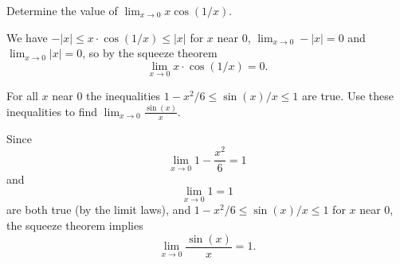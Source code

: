 \documentclass[nooutcomes]{ximera}
\begin{document}
\begin{problem}


  Determine the value of $\displaystyle\lim_{x \to 0} x \cos(1/x)$.
  \begin{freeResponse}
    We have $-|x| \le x \cdot \cos(1/x) \le |x|$ for $x$ near 0, $\lim_{x \to 0} -|x| = 0$ and $\lim_{x \to 0} |x| = 0$, so by the squeeze theorem
    \[
      \lim_{x \to 0} x \cdot \cos(1/x) = 0.
    \]
  \end{freeResponse}

\end{problem}
	
	
	
	
	
	
\begin{problem}
 For all $x$ near 0 the inequalities $1 - x^2/6 \le \sin(x)/x \le 1$ are true.
  Use these inequalities to find $\displaystyle\lim_{x \to 0} \frac{\sin(x)}{x}$.
  \begin{freeResponse}
    Since
    \[
      \lim_{x \to 0} 1 - \frac{x^2}{6} = 1
    \]
    and
    \[
     \lim_{x \to 0} 1 = 1
    \]
    are both true (by the limit laws), and $1 - x^2/6 \le \sin(x)/x \le 1$ for $x$ near 0, the squeeze theorem implies
    \[
     \lim_{x \to 0} \frac{\sin(x)}{x} = 1.
    \]


  \end{freeResponse}



\end{problem}
	
\end{document}
